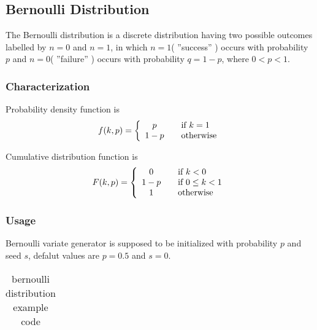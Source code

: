 \subsection{Bernoulli Distribution} \label{bernoullidistribution}

The Bernoulli distribution is a discrete distribution having two possible outcomes labelled by $n = 0$ and $n = 1$, in which $n = 1$( ''success'' ) occurs with probability $p$ and $n = 0$( ''failure'' ) occurs with probability $q = 1 - p$, where $0 < p < 1$.


\subsubsection{Characterization}

Probability density function is
\begin{equation}
 f(k,p) = \left\{
  \begin{array}{c l}
      p   & \quad \text{if $k=1$} \\
      1-p &  \quad \text{otherwise} \\
  \end{array} \right.
\end{equation}

Cumulative distribution function is
\begin{equation}
 F(k,p) = \left\{
  \begin{array}{c l}
      0                                    & \quad \text{if $k < 0$} \\
      1-p                                  & \quad \text{if $0 \leq k < 1$}\\
      1                                    & \quad \text{otherwise}
  \end{array} \right.
\end{equation}


\subsubsection{Usage}

Bernoulli variate generator is supposed to be initialized with probability $p$ and seed $s$, defalut values are $p = 0.5$ and $s = 0$.

\begin{small}
\begin{ttfamily}
\begin{center}
\begin{longtable}{|l|}
\caption{bernoulli distribution example code} \\
\hline 

\hline
\end{longtable}
\end{center}
\end{ttfamily}
\end{small}


